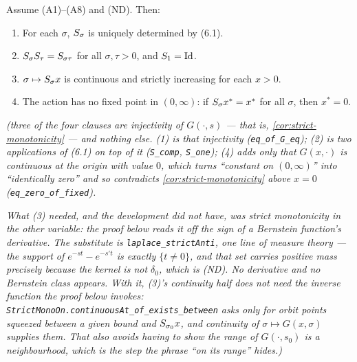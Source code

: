 \begin{lemma}\label{lem:action-rigidity}
\leanok
Assume (A1)--(A8) and (ND). Then:
\begin{enumerate}
\item For each $\sigma$, $S_\sigma$ is uniquely determined by (6.1).
\item $S_\sigma S_\tau = S_{\sigma\tau}$ for all $\sigma, \tau > 0$, and
$S_1 = \mathrm{Id}$.
\item $\sigma \mapsto S_\sigma x$ is continuous and strictly increasing for each $x > 0$.
\item The action has no fixed point in $(0,\infty)$: if $S_\sigma x^* = x^*$ for all
$\sigma$, then $x^* = 0$.
\end{enumerate}
\statusT\quad\emph{(three of the four clauses are injectivity of $G(\cdot,s)$ --- that is,
\ref{cor:strict-monotonicity} --- and nothing else. (1) \emph{is} that injectivity
(\texttt{eq\_of\_G\_eq}); (2) is two applications of (6.1) on top of it (\texttt{S\_comp},
\texttt{S\_one}); (4) adds only that $G(x,\cdot)$ is continuous at the origin with value $0$,
which turns ``constant on $(0,\infty)$'' into ``identically zero'' and so contradicts
\ref{cor:strict-monotonicity} above $x = 0$ (\texttt{eq\_zero\_of\_fixed}).}

\emph{What (3) needed, and the development did not have, was strict monotonicity in the
\emph{other} variable: the proof below reads it off the sign of a Bernstein function's
derivative. The substitute is \texttt{laplace\_strictAnti}, one line of measure theory --- the
support of $e^{-st} - e^{-s't}$ is exactly $\{t \ne 0\}$, and that set carries positive mass
precisely because the kernel is not $\delta_0$, which is (ND). No derivative and no Bernstein
class appears. With it, (3)'s continuity half does not need the inverse function the proof below
invokes: \texttt{StrictMonoOn.continuousAt\_of\_exists\_between} asks only for orbit points
squeezed between a given bound and $S_{\sigma_0} x$, and continuity of
$\sigma \mapsto G(x,\sigma)$ supplies them. That also avoids having to show the range of
$G(\cdot,s_0)$ is a neighbourhood, which is the step the phrase ``on its range'' hides.)}
\end{lemma}

